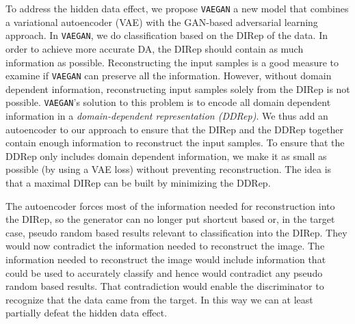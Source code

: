 \documentclass{article}
\newcommand{\markw}[1]{\textbf{\color{green}Mark: #1}}
\newcommand{\adrian}[1]{\textbf{\color{blue}Adrian: #1}}
\begin{document}

To address the hidden data effect, we propose \verb"VAEGAN" a new model that combines a variational autoencoder (VAE) with the GAN-based adversarial learning approach. In \verb"VAEGAN", we do classification based on the DIRep of the data. %
In order to achieve more accurate DA, the DIRep should contain as much information as possible.
Reconstructing the input samples is a good measure to examine if \verb"VAEGAN" can preserve all the information. However, without domain dependent information, reconstructing input samples solely from the DIRep is not possible. \verb"VAEGAN"'s solution to this problem is to encode all domain dependent information in a \textit{domain-dependent representation (DDRep)}. We thus add an autoencoder to our approach to ensure that the DIRep and the DDRep together contain enough information to reconstruct the input samples. To ensure that the DDRep only includes domain dependent information, we make it as small as possible (by using a VAE loss) without preventing reconstruction. The idea is that a maximal DIRep can be built by minimizing the DDRep. 

The autoencoder forces most of the information needed for reconstruction into the DIRep, so the generator can no longer put shortcut based or, in the target case, pseudo random based results relevant to classification into the DIRep. They would now contradict the information needed to reconstruct the image.  The information needed to reconstruct the image would include information that could be used to accurately classify and hence would contradict any pseudo random based results.  That contradiction would enable the discriminator to recognize that the data came from the target.  In this way we can at least partially defeat the hidden data effect.
\end{document}
